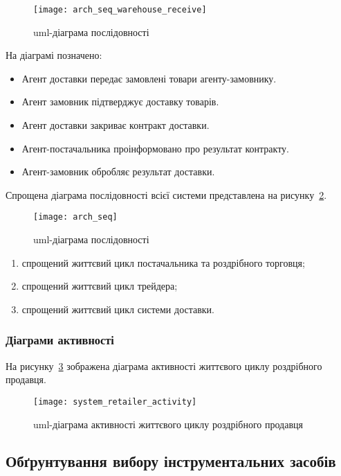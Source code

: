 \begin{figure}[H]
	\centering
	\texttt{[image: arch\_seq\_warehouse\_receive]}
	\caption{\acrshort{uml}-діаграма послідовності}
	\label{fig:arch_seq_warehouse_receive}
\end{figure} 

На діаграмі позначено:
\begin{itemize}
	\item Агент доставки передає замовлені товари агенту-замовнику.
	\item Агент замовник підтверджує доставку товарів.
	\item Агент доставки закриває контракт доставки.
	\item Агент-постачальника проінформовано про результат контракту. 
	\item Агент-замовник обробляє результат доставки.
\end{itemize}

Спрощена діаграма послідовності всієї системи представлена на рисунку~\ref{fig:arch_seq}.

\begin{figure}[H]
	\centering
	\texttt{[image: arch\_seq]}
	\caption{\acrshort{uml}-діаграма послідовності}
	\label{fig:arch_seq}
\end{figure} 

\begin{enumerate}[label={\arabic*)}]
	\item спрощений життєвий цикл постачальника та роздрібного торговця;
	\item спрощений життєвий цикл трейдера;
	\item спрощений життєвий цикл системи доставки.
\end{enumerate}

\subsubsection{Діаграми активності}
На рисунку~\ref{fig:system_retailer_activity} зображена діаграма активності життєвого циклу роздрібного продавця.

\begin{figure}[H]
	\centering
	\texttt{[image: system\_retailer\_activity]}
	\caption{\acrshort{uml}-діаграма активності життєвого циклу роздрібного продавця}
	\label{fig:system_retailer_activity}
\end{figure} 

\subsection{Обґрунтування вибору інструментальних засобів}

